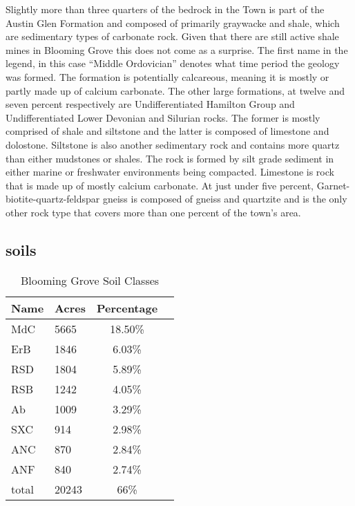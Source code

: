 
Slightly more than three quarters of the bedrock in the Town is part of the
Austin Glen Formation and composed of primarily graywacke and shale, which are
sedimentary types of carbonate rock. Given that there are still active shale
mines in Blooming Grove this does not come as a surprise. The first name in the
legend, in this case “Middle Ordovician” denotes what time period the geology
was formed. The formation is potentially calcareous, meaning it is mostly or
partly made up of calcium carbonate. The other large formations, at twelve and
seven percent respectively are Undifferentiated Hamilton Group and
Undifferentiated Lower Devonian and Silurian rocks. The former is mostly
comprised of shale and siltstone and the latter is composed of limestone and
dolostone. Siltstone is also another sedimentary rock and contains more quartz
than either mudstones or shales. The rock is formed by silt grade sediment in
either marine or freshwater environments being compacted. Limestone is rock
that is made up of mostly calcium carbonate. At just under five percent,
Garnet-biotite-quartz-feldspar gneiss is composed of gneiss and quartzite and
is the only other rock type that covers more than one percent of the town’s
area.

\subsection{soils}

\begin{table}[h!]
    \begin{tabular}{l l c c }
    Name & Acres & Percentage \\
    \hline
    MdC & 5665 & 18.50\%\\
    ErB & 1846 & 6.03\%\\
    RSD & 1804 & 5.89\%  \\
    RSB & 1242 & 4.05\%\\
    Ab & 1009 & 3.29\%\\
    SXC & 914 & 2.98\%\\
    ANC & 870 & 2.84\%\\
    ANF & 840 & 2.74\% \\
    total & 20243 & 66\% &\\
    \end{tabular}
    \caption{Blooming Grove Soil Classes}
    \label{tab:BG_soil}
\end{table}